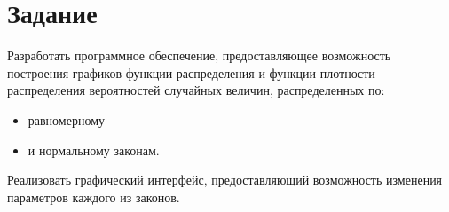 \chapter{Задание}

Разработать программное обеспечение, предоставляющее возможность построения
графиков функции распределения и функции плотности распределения вероятностей
случайных величин, распределенных по:

\begin{itemize}
    \item равномерному
    \item и нормальному законам.
\end{itemize}

Реализовать графический интерфейс, предоставляющий возможность изменения
параметров каждого из законов.
